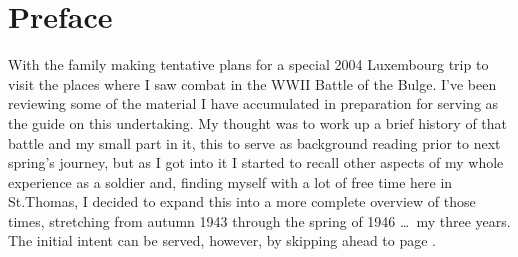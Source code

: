 \chapter*{Preface}

\thispagestyle{plain}
\label{preface}
With the family making tentative plans for a special 2004 Luxembourg trip to visit the places where I saw combat in the WW\thinspace II Battle of the Bulge. I've been reviewing some of the material I have accumulated in preparation for serving as the guide on this undertaking. My thought was to work up a brief history of that battle and my small part in it, this to serve as background reading prior to next spring's journey, but as I got into it I started to recall other aspects of my whole experience as a soldier and, finding myself with a lot of free time here in St.\@ Thomas, I decided to expand this into a more complete overview of those times, stretching from autumn 1943 through the spring of 1946 \ldots\ my three years. The initial intent can be served, however, by skipping ahead to page \pageref{battle-of-the-bulge}.
\clearpage

